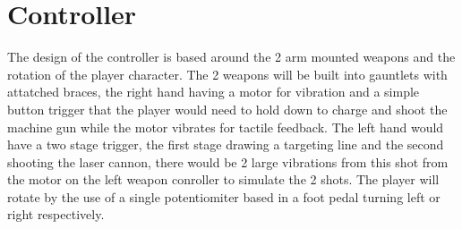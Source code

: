 \documentclass[10pt,a4paper]{scrartcl}
\begin{document}
	\section{Controller}
			The design of the controller is based around the 2 arm mounted weapons and the rotation of the player character. The 2 weapons will be built into gauntlets with attatched braces, the right hand having a motor for vibration and a simple button trigger that the player would need to hold down to charge and shoot the machine gun while the motor vibrates for tactile feedback. The left hand would have a two stage trigger, the first stage drawing a targeting line and the second shooting the laser cannon, there would be 2 large vibrations from this shot from the motor on the left weapon conroller to simulate the 2 shots. The player will rotate by the use of a single potentiomiter based in a foot pedal turning left or right respectively.
\end{document}
